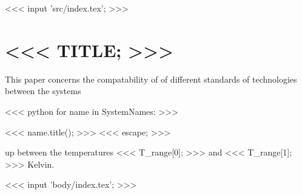 <<< input 'src/index.tex'; >>>


    \section{<<< TITLE; >>>}
    \author{<<< AUTHOR; >>>}

    This paper concerns the compatability of
    of different standards of technologies between the systems

    \begin{itemise}
        <<< python
        for name in SystemNames:
        >>>
        \item <<< name.title(); >>>
        <<< escape; >>>
    \end{itemise}

    up between the temperatures <<< T_range[0]; >>> and <<< T_range[1]; >>> Kelvin.

    <<< input 'body/index.tex'; >>>

